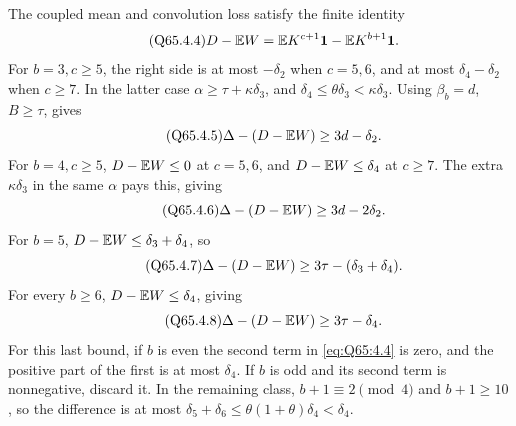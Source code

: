 The coupled mean and convolution loss satisfy the finite identity
\begin{equation}\tag{Q65.4.4}\label{eq:Q65:4.4}
D-\mathbb E W=\mathbb E K^{c+1}\mathbf1-\mathbb E K^{b+1}\mathbf1.
\end{equation}
For \(b=\allowbreak 3,\allowbreak c\ge\allowbreak 5\), the right side is at most \(-\delta_2\) when
\(c=\allowbreak 5,\allowbreak 6\), and at most \(\delta_4-\delta_2\) when \(c\ge\allowbreak 7\).
In the latter case \(\alpha\ge\allowbreak \tau+\kappa\delta_3\), and
\(\delta_4\le\allowbreak \theta\delta_3<\allowbreak \kappa\delta_3\).
Using \(\beta_b=\allowbreak d\), \(B\ge\allowbreak \tau\), gives
\begin{equation}\tag{Q65.4.5}\label{eq:Q65:4.5}
\Delta-(D-\mathbb E W)\ge3d-\delta_2.
\end{equation}
For \(b=\allowbreak 4,\allowbreak c\ge\allowbreak 5\), \(D-\mathbb E W\le\allowbreak 0\) at \(c=\allowbreak 5,\allowbreak 6\), and
\(D-\mathbb E W\le\allowbreak \delta_4\) at \(c\ge\allowbreak 7\).
The extra \(\kappa\delta_3\) in the same \(\alpha\) pays this, giving
\begin{equation}\tag{Q65.4.6}\label{eq:Q65:4.6}
\Delta-(D-\mathbb E W)\ge3d-2\delta_2.
\end{equation}
For \(b=\allowbreak 5\), \(D-\mathbb E W\le\allowbreak \delta_3+\delta_4\), so
\begin{equation}\tag{Q65.4.7}\label{eq:Q65:4.7}
\Delta-(D-\mathbb E W)\ge3\tau-(\delta_3+\delta_4).
\end{equation}
For every \(b\ge\allowbreak 6\), \(D-\mathbb E W\le\allowbreak \delta_4\), giving
\begin{equation}\tag{Q65.4.8}\label{eq:Q65:4.8}
\Delta-(D-\mathbb E W)\ge3\tau-\delta_4.
\end{equation}
For this last bound, if \(b\) is even the second term in
\eqref{eq:Q65:4.4} is zero, and the positive part of the first is
at most \(\delta_4\). If \(b\) is odd and its second term is
nonnegative, discard it. In the remaining class,
\(b+1\equiv2\pmod4\) and \(b+1\ge\allowbreak 10\), so the difference is at most
\(\delta_5+\delta_6\le\allowbreak \theta(1+\theta)\delta_4<\allowbreak \delta_4\).

